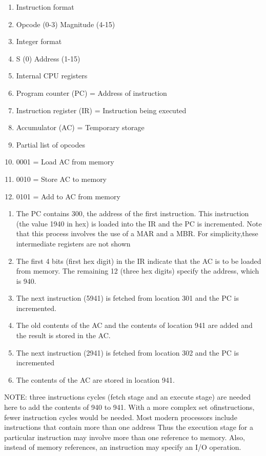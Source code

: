 \documentclass{article}
\begin{document}
\begin{enumerate}[label=(\alph*)]
\item Instruction format
	\item[] Opcode (0-3) Magnitude (4-15)
\item Integer format
	\item[] S (0) Address (1-15)
\item Internal CPU registers
	\item[] Program counter (PC) = Address of instruction
	\item[] Instruction register (IR) = Instruction being executed
	\item[] Accumulator (AC) = Temporary storage
\item Partial list of opcodes
	\item[] 0001 = Load AC from memory
	\item[] 0010 = Store AC to memory
	\item[] 0101 = Add to AC from memory
\end{enumerate}

\begin{enumerate}[label = \arabic*]
\item The PC contains 300, the address of the first instruction. This instruction (the value 1940 in hex) is loaded into the IR and the PC is incremented. Note that this process involves the use of a MAR and a MBR. For simplicity,these intermediate registers are not shown
\item The first 4 bits (first hex digit) in the IR indicate that the AC is to be loaded from memory. The remaining 12 (three hex digits) specify the address, which is 940.
\item The next instruction (5941) is fetched from location 301 and the PC is incremented.
\item The old contents of the AC and the contents of  location 941 are added and the result is stored in the AC.
\item The next instruction (2941) is fetched from location 302 and the PC is incremented
\item The contents of the AC are stored in location 941.
\end{enumerate}

NOTE: three instructions cycles (fetch stage and an execute stage) are needed here to add the contents of 940 to 941. With a more complex set ofinstructions, fewer instruction cycles would be needed. Most modern processors include instructions that contain more than one address Thus the execution stage for a particular instruction may involve more than one reference to memory. Also, instead of memory references, an instruction may specify an I/O operation.
\end{document}
